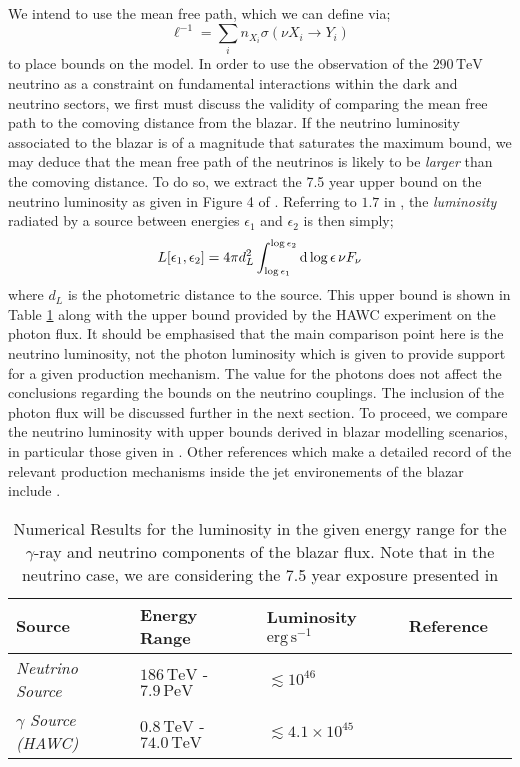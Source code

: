 We intend to use the mean free path, which we can define via;
\begin{equation}
  \ell^{-1} = \sum_{i}{n_{X_i} \sigma(\nu X_i \rightarrow Y_i)}
\end{equation}
to place bounds on the model. In order to use the observation of the $290 \, \textrm{TeV}$ neutrino as a constraint on fundamental interactions within the dark and neutrino sectors, we first must discuss the validity of comparing the mean free path to the comoving distance from the blazar. If the neutrino luminosity associated to the blazar is of a magnitude that saturates the maximum bound, we may deduce that the mean free path of the neutrinos is likely to be \textit{larger} than the comoving distance. To do so, we extract the 7.5 year upper bound on the neutrino luminosity as given in Figure 4 of \cite{Ackermann2018}. Referring to $1.7$ in \cite{dermer2009high}, the \textit{luminosity} radiated by a source between energies $\epsilon_1$ and $\epsilon_2$ is then simply;
\begin{equation}
  L[\epsilon_1, \epsilon_2] = 4\pi d_L^2 \int_{\log \epsilon_1}^{\log \epsilon_2}{\mathrm{d}\log\epsilon\, \nu F_\nu }
\end{equation}
where $d_L$ is the photometric distance to the source. This upper bound is shown in Table \ref{tab:luminosity} along with the upper bound provided by the HAWC experiment on the photon flux. It should be emphasised that the main comparison point here is the neutrino luminosity, not the photon luminosity which is given to provide support for a given production mechanism. The value for the photons does not affect the conclusions regarding the bounds on the neutrino couplings. The inclusion of the photon flux will be discussed further in the next section. To proceed, we compare the neutrino luminosity with upper bounds derived in blazar modelling scenarios, in particular those given in \cite{Padovani2019}. Other references which make a detailed record of the relevant production mechanisms inside the jet environements of the blazar include \cite{Gao2018nat, Rodrigues2018, Padovani2018, Keivani2018}. 
\begin{table}[t]
\centering
\begin{tabular}{p{3.0cm}p{3cm}p{4cm}p{3.5cm}p{2.0cm}}
\toprule \textbf{Source} & \textbf{Energy Range} & \hfill \textbf{Luminosity} $\text{erg}\,\text{s}^{-1}$ & \textbf{Reference}\\
\midrule
\textit{Neutrino Source} & $186 \, \textrm{TeV}$ - $7.9 \, \textrm{PeV}$ & \hfill $\lesssim 10^{46}$ & \cite{Ackermann2018} \\
\textit{$\gamma$ Source (HAWC)} & $0.8 \, \textrm{TeV}$ - $74.0 \, \textrm{TeV}$  & \hfill $\lesssim 4.1 \times 10^{45}$ & \cite{Ackermann2018, HAWC} \\
\bottomrule
\end{tabular}
\caption{Numerical Results for the luminosity in the given energy range for the $\gamma$-ray and neutrino components of the blazar flux. Note that in the neutrino case, we are considering the 7.5 year exposure presented in \cite{Ackermann2018}}
\label{tab:luminosity}
\end{table}
